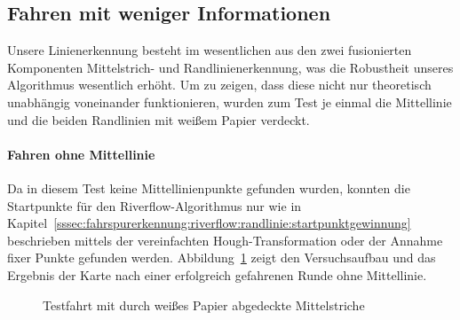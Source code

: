 \subsection{Fahren mit weniger Informationen \dcfirstauthorshort}

Unsere Linienerkennung besteht im wesentlichen aus den zwei fusionierten Komponenten Mittelstrich- und Randlinienerkennung, was die Robustheit unseres Algorithmus wesentlich erhöht. Um zu zeigen, dass diese nicht nur theoretisch unabhängig voneinander funktionieren, wurden zum Test je einmal die Mittellinie und die beiden Randlinien mit weißem Papier verdeckt. 


\paragraph{Fahren ohne Mittellinie}
Da in diesem Test keine Mittellinienpunkte gefunden wurden, konnten die Startpunkte für den Riverflow-Algorithmus nur wie in Kapitel~\ref{sssec:fahrspurerkennung:riverflow:randlinie:startpunktgewinnung} beschrieben mittels der vereinfachten Hough-Transformation oder der Annahme fixer Punkte gefunden werden. Abbildung~\ref{fig:evaluation:riverflow:ohneMittellinie} zeigt den Versuchsaufbau und das Ergebnis der Karte nach einer erfolgreich gefahrenen Runde ohne Mittellinie.

\begin{figure}[htbp] %
	\hfill
	\caption{Testfahrt mit durch weißes Papier abgedeckte Mittelstriche}
	\label{fig:evaluation:riverflow:ohneMittellinie}
\end{figure}

